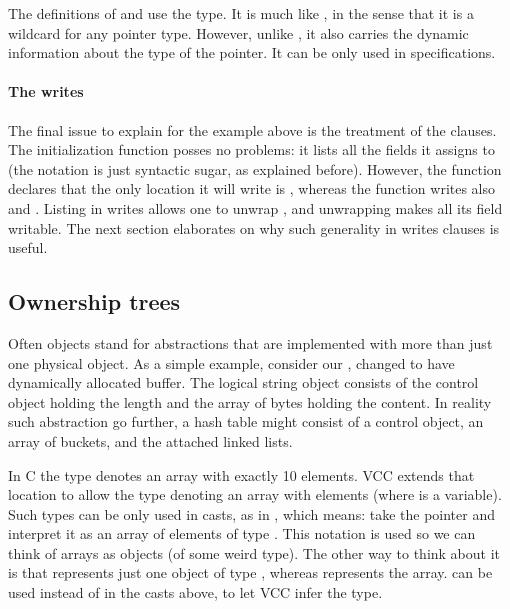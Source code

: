 \noindent
The definitions of  and 
use the \vcc{\object} type.
It is much like , in the sense that it is a wildcard for any pointer type.
However, unlike , it also carries the dynamic information about the type of the pointer.
It can be only used in specifications.

\paragraph{The writes}

The final issue to explain for the example above is the treatment of the  clauses.
The initialization function posses no problems: it lists all the fields it assigns to
(the  notation is just syntactic sugar, as explained before).
However, the function  declares that the
only location it will write is
, whereas the function writes also  and .
Listing  in writes allows one to unwrap , and unwrapping 
makes all its field writable. 
The next section elaborates on why such generality in writes clauses is useful.

\subsection{Ownership trees}

Often objects stand for abstractions that are implemented with
more than just one physical object.
As a simple example, consider our , changed to have dynamically
allocated buffer.
The logical string object consists of the control object holding the length
and the array of bytes holding the content.
In reality such abstraction go further, \eg a hash table might consist of a control object, an array of buckets,
and the attached linked lists.


\noindent
In C the type  denotes an array with exactly 10 elements.
VCC extends that location to allow
the type  denoting an array with  elements
(where  is a variable).
Such types can be only used in casts, as in %
,
which means: take the pointer  and interpret it as an array
of  elements of type .
This notation is used so we can think of arrays as objects (of some weird type).
The other way to think about it is that  represents just
one object of type , whereas 
represents the array.
\vcc{\any} can be used instead of  in the casts above, to let
VCC infer the type.

